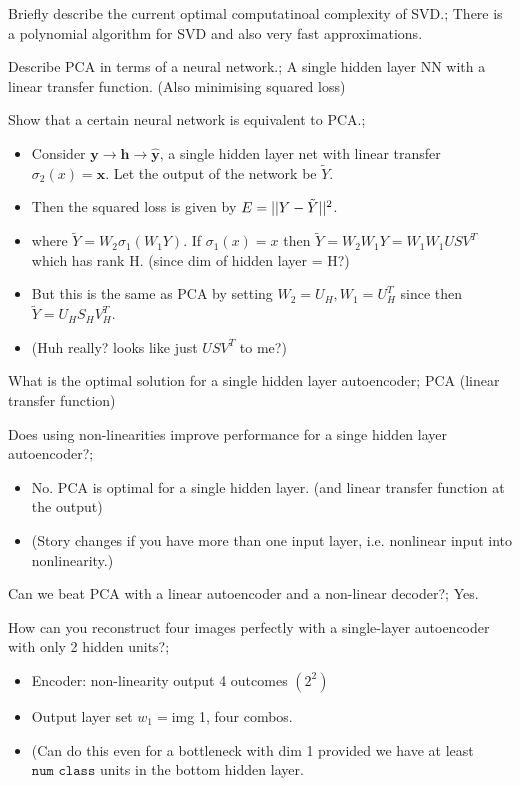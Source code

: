 \documentclass{article}
\begin{document}
Briefly describe the current optimal computatinoal complexity of SVD.; There is a polynomial algorithm for SVD and also very fast approximations.

Describe PCA in terms of a neural network.; A single hidden layer NN with a linear transfer function. (Also minimising squared loss)

Show that a certain neural network is equivalent to PCA.; \begin{itemize}
    \item Consider $\bm{y}\rightarrow \bm{h}\rightarrow \hat{\bm{y}}$, a single hidden layer net with linear transfer $\sigma_2(x) = \bm{x}$. Let the output of the network be $\tilde{Y}$. 
    \item Then the squared loss is given by $E = ||Y - \Tilde{Y}||^2$.
    \item where $\tilde{Y}=W_2\sigma_1(W_1Y)$. If $\sigma_1(x) = x$ then $\tilde{Y}=W_2W_1Y = W_1W_1USV^T$ which has rank H. (since dim of hidden layer = H?)
    \item But this is the same as PCA by setting $W_2 = U_H, W_1 = U^T_H$ since then $\tilde{Y}=U_HS_HV_H^T$.
    \item (Huh really? looks like just $USV^T$ to me?)
\end{itemize}

What is the optimal solution for a single hidden layer autoencoder; PCA (linear transfer function)

Does using non-linearities improve performance for a singe hidden layer autoencoder?; \begin{itemize}
    \item No. PCA is optimal for a single hidden layer. (and linear transfer function at the output)
    \item (Story changes if you have more than one input layer, i.e. nonlinear input into nonlinearity.)
\end{itemize}

Can we beat PCA with a linear autoencoder and a non-linear decoder?; Yes.

How can you reconstruct four images perfectly with a single-layer autoencoder with only 2 hidden units?; \begin{itemize}
    \item Encoder: non-linearity output 4 outcomes $(2^2)$
    \item Output layer set $w_1=$img 1, four combos.
    \item (Can do this even for a bottleneck with dim 1 provided we have at least $\texttt{num class}$ units in the bottom hidden layer.
\end{itemize}
\end{document}
